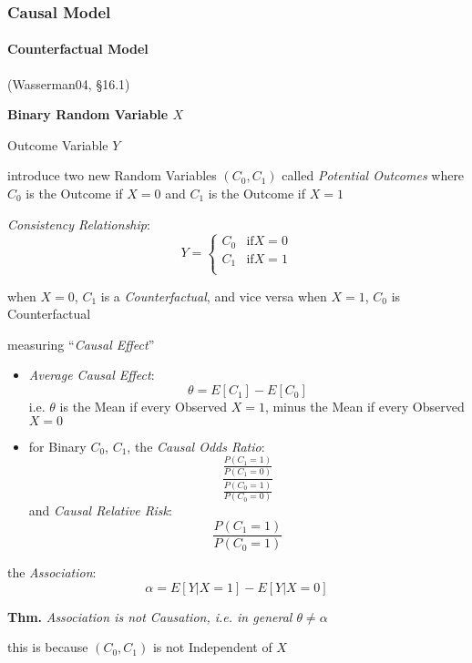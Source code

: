 \subsubsection{Causal Model}\label{sec:causal_model}




\paragraph{Counterfactual Model}\label{sec:counterfactual}\hfill

(Wasserman04, \S16.1)

\textbf{Binary Random Variable $X$}

Outcome Variable $Y$

introduce two new Random Variables $(C_0, C_1)$ called \emph{Potential Outcomes}
where $C_0$ is the Outcome if $X = 0$ and $C_1$ is the Outcome if $X = 1$

\emph{Consistency Relationship}:
\[
  Y = \begin{cases}
    C_0 & \text{if} X = 0 \\
    C_1 & \text{if} X = 1 \\
  \end{cases}
\]

when $X = 0$, $C_1$ is a \emph{Counterfactual}, and vice versa when $X = 1$,
$C_0$ is Counterfactual

measuring ``\emph{Causal Effect}''

\begin{itemize}
  \item \emph{Average Causal Effect}:
    \[
      \theta = E[C_1] - E[C_0]
    \]
    i.e. $\theta$ is the Mean if every Observed $X = 1$, minus the Mean if every
    Observed $X = 0$

  \item for Binary $C_0$, $C_1$, the \emph{Causal Odds Ratio}:
    \[
      \frac{
        \frac{P(C_1 = 1)}{P(C_1 = 0)}
      }{
        \frac{P(C_0 = 1)}{P(C_0 = 0)}
      }
    \]
    and \emph{Causal Relative Risk}:
    \[
      \frac{P(C_1 = 1)}{P(C_0 = 1)}
    \]
\end{itemize}

the \emph{Association}:
\[
  \alpha = E[Y | X = 1] - E[Y | X = 0]
\]

\textbf{Thm.} \emph{Association is not Causation, i.e. in general
$\theta \neq \alpha$}

this is because $(C_0, C_1)$ is not Independent of $X$

